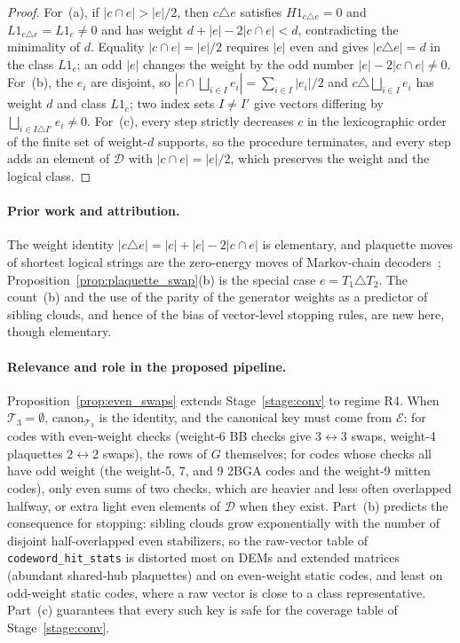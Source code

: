 \documentclass[12pt]{article}
\theoremstyle{definition}
\newcommand{\Dc}{\mathcal{D}}
\newcommand{\Tc}{\mathcal{T}_3}
\newcommand{\ttt}[1]{\texttt{#1}}
\begin{document}
\begin{proof}
For~(a), if $|c \cap e| > |e|/2$, then $c \triangle e$ satisfies $H 1_{c \triangle e} = 0$ and $L 1_{c \triangle e} = L
1_c \neq 0$ and has weight $d + |e| - 2|c \cap e| < d$, contradicting the minimality of $d$. Equality $|c \cap e| =
|e|/2$ requires $|e|$ even and gives $|c \triangle e| = d$ in the class $L 1_c$; an odd $|e|$ changes the weight by
the odd number $|e| - 2|c \cap e| \neq 0$. For~(b), the $e_i$ are disjoint, so $|c \cap \bigsqcup_{i \in I} e_i| =
\sum_{i \in I} |e_i|/2$ and $c \triangle \bigsqcup_{i \in I} e_i$ has weight $d$ and class $L 1_c$; two index sets $I
\neq I'$ give vectors differing by $\bigsqcup_{i \in I \triangle I'} e_i \neq 0$. For~(c), every step strictly
decreases $c$ in the lexicographic order of the finite set of weight-$d$ supports, so the procedure terminates, and
every step adds an element of $\Dc$ with $|c \cap e| = |e|/2$, which preserves the weight and the logical class.
\end{proof}

\paragraph{Prior work and attribution.}
The weight identity $|c \triangle e| = |c| + |e| - 2|c \cap e|$ is elementary, and plaquette moves of shortest
logical strings are the zero-energy moves of Markov-chain decoders~\cite{WoottonLoss2012,HutterWoottonLoss2014};
Proposition~\ref{prop:plaquette_swap}(b) is the special case $e = T_1 \triangle T_2$. The count~(b) and the use of the
parity of the generator weights as a predictor of sibling clouds, and hence of the bias of vector-level stopping rules,
are new here, though elementary.

\paragraph{Relevance and role in the proposed pipeline.}
Proposition~\ref{prop:even_swaps} extends Stage~\ref{stage:conv} to regime R4. When $\Tc = \emptyset$,
$\mathrm{canon}_{\Tc}$ is the identity, and the canonical key must come from $\mathcal{E}$: for codes with even-weight
checks (weight-6 BB checks give $3 \leftrightarrow 3$ swaps, weight-4 plaquettes $2 \leftrightarrow 2$ swaps), the rows
of $G$ themselves; for codes whose checks all have odd weight (the weight-5, 7, and 9 2BGA codes and the weight-9
mitten codes), only even sums of two checks, which are heavier and less often overlapped halfway, or extra light
even elements of $\Dc$ when they exist. Part~(b) predicts the
consequence for stopping: sibling clouds grow exponentially with the number of disjoint half-overlapped even
stabilizers, so the raw-vector table of \ttt{codeword\_hit\_stats} is distorted most on DEMs and extended matrices
(abundant shared-hub plaquettes) and on even-weight static codes, and least on odd-weight static codes, where a raw
vector is close to a class representative. Part~(c) guarantees that every such key is safe for the coverage table of
Stage~\ref{stage:conv}.
\end{document}
